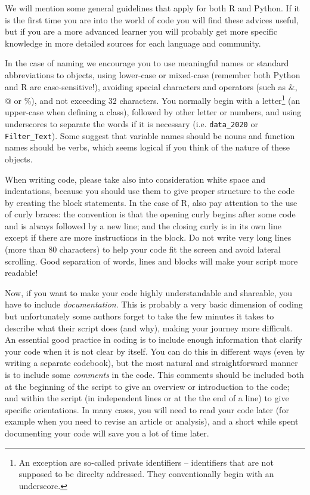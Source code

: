 We will mention some general guidelines that apply for both R and Python. If it is the first time you are into the world of code you will find these advices useful,  but if you are a more advanced learner you will probably get more specific knowledge in more detailed sources for each language and community.

In the case of naming we encourage you to use meaningful names or standard abbreviations to objects, using lower-case or mixed-case (remember both Python and R are case-sensitive!), avoiding special characters and operators (such as \&, @ or \%), and not exceeding 32 characters. You normally begin with a letter\footnote{An exception are so-called private identifiers -- identifiers that are not supposed to be direclty addressed. They conventionally begin with an underscore.} (an upper-case when defining a class), followed by other letter or numbers, and using underscores to separate the words if it is necessary (i.e. \texttt{data\_2020} or \texttt{Filter\_Text}). Some suggest that variable names should be nouns and function names should be verbs, which seems logical if you think of the nature of these objects. 

When writing code, please take also into consideration white space and indentations, because you should use them to give proper structure to the code by creating the block statements. In the case of R, also pay attention to the use of curly braces: the convention is that the opening curly begins after some code and is always followed by a new line; and the closing curly is in its own line except if there are more instructions in the block. Do not write very long lines (more than 80 characters) to help your code fit the screen and avoid lateral scrolling. Good separation of words, lines and blocks will make your script more readable!

Now, if you want to make your code highly understandable and shareable, you have to include \textit{documentation}.
This is probably a very basic dimension of coding but unfortunately some authors forget to take the few minutes it takes to describe what their script does (and why), making your journey more difficult.
An essential good practice in coding is to include enough information that clarify your code when it is not clear by itself.
You can do this in different ways (even by writing a separate codebook), but the most natural and straightforward manner is to include some  \textit{comments} in the code.
This comments should be included both at the beginning of the script to give an overview or introduction to the code;
and within the script (in independent lines or at the the end of a line) to give specific orientations.
In many cases, you will need to read your code later (for example when you need to revise an article or analysis), and a short while spent documenting your code will save you a lot of time later.

